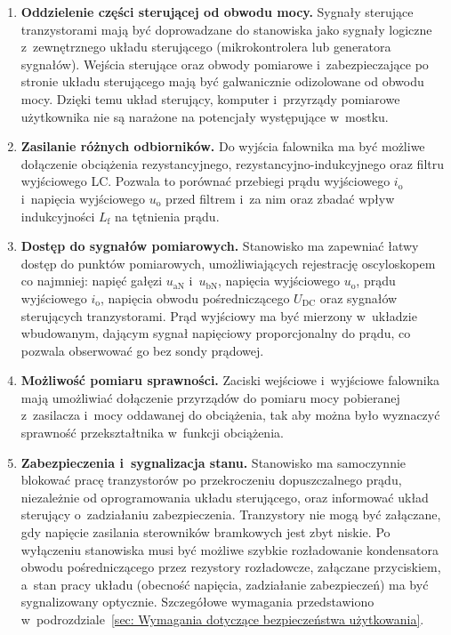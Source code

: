 \begin{enumerate}[label=\textbf{F\arabic*.}, leftmargin=*, itemsep=4pt]
  \item \textbf{Oddzielenie części sterującej od obwodu mocy.} Sygnały
    sterujące tranzystorami mają być doprowadzane do stanowiska jako
    sygnały logiczne z~zewnętrznego układu sterującego (mikrokontrolera lub
    generatora sygnałów). Wejścia sterujące oraz obwody pomiarowe
    i~zabezpieczające po stronie układu sterującego mają być galwanicznie
    odizolowane od obwodu mocy. Dzięki temu układ sterujący, komputer
    i~przyrządy pomiarowe użytkownika nie są narażone na potencjały
    występujące w~mostku.

  \item \textbf{Zasilanie różnych odbiorników.} Do wyjścia falownika ma
    być możliwe dołączenie obciążenia rezystancyjnego,
    rezystancyjno-indukcyjnego oraz filtru wyjściowego LC. Pozwala to
    porównać przebiegi prądu wyjściowego $i_\mathrm{o}$ i~napięcia
    wyjściowego $u_\mathrm{o}$ przed filtrem i~za nim oraz zbadać wpływ
    indukcyjności $L_\mathrm{f}$ na tętnienia prądu.

  \item \textbf{Dostęp do sygnałów pomiarowych.} Stanowisko ma zapewniać
    łatwy dostęp do punktów pomiarowych, umożliwiających rejestrację
    oscyloskopem co najmniej: napięć gałęzi $u_\mathrm{aN}$
    i~$u_\mathrm{bN}$, napięcia wyjściowego $u_\mathrm{o}$, prądu
    wyjściowego $i_\mathrm{o}$, napięcia obwodu pośredniczącego
    $U_\mathrm{DC}$ oraz sygnałów sterujących tranzystorami. Prąd
    wyjściowy ma być mierzony w~układzie wbudowanym, dającym sygnał
    napięciowy proporcjonalny do prądu, co pozwala obserwować go bez
    sondy prądowej.

  \item \textbf{Możliwość pomiaru sprawności.} Zaciski wejściowe
    i~wyjściowe falownika mają umożliwiać dołączenie przyrządów do pomiaru
    mocy pobieranej z~zasilacza i~mocy oddawanej do obciążenia, tak aby
    można było wyznaczyć sprawność przekształtnika w~funkcji obciążenia.

  \item \textbf{Zabezpieczenia i~sygnalizacja stanu.} Stanowisko ma
    samoczynnie blokować pracę tranzystorów po przekroczeniu
    dopuszczalnego prądu, niezależnie od oprogramowania układu
    sterującego, oraz informować układ sterujący o~zadziałaniu
    zabezpieczenia. Tranzystory nie mogą być załączane, gdy napięcie
    zasilania sterowników bramkowych jest zbyt niskie. Po wyłączeniu
    stanowiska musi być możliwe szybkie rozładowanie kondensatora obwodu
    pośredniczącego przez rezystory rozładowcze, załączane przyciskiem,
    a~stan pracy układu (obecność napięcia, zadziałanie zabezpieczeń) ma
    być sygnalizowany optycznie. Szczegółowe wymagania
    przedstawiono w~podrozdziale~\ref{sec: Wymagania dotyczące bezpieczeństwa użytkowania}.


\end{enumerate}
